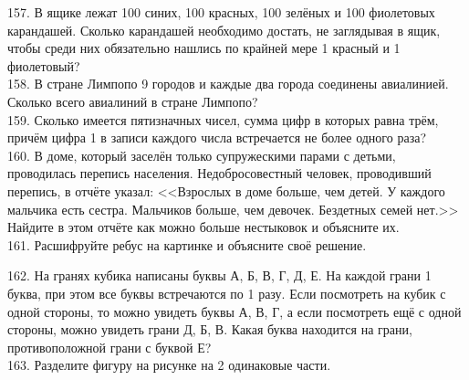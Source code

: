 \documentclass[12pt]{article}
\begin{document}
157. В ящике лежат 100 синих, 100 красных, 100 зелёных и 100 фиолетовых карандашей. Сколько карандашей необходимо достать, не заглядывая в ящик, чтобы среди них обязательно нашлись по крайней мере 1 красный и 1 фиолетовый?\\
158. В стране Лимпопо 9 городов и каждые два города соединены авиалинией. Сколько всего авиалиний в стране Лимпопо?\\
159. Сколько имеется пятизначных чисел, сумма цифр в которых равна трём, причём цифра 1 в записи каждого числа встречается не более одного раза?\\
160. В доме, который заселён только супружескими парами с детьми, проводилась перепись населения. Недобросовестный человек, проводивший перепись, в отчёте указал: <<Взрослых в доме больше, чем детей. У каждого мальчика есть сестра. Мальчиков больше, чем девочек. Бездетных семей нет.>> Найдите в этом отчёте
как можно больше нестыковок и объясните их.\\
161. Расшифруйте ребус на картинке и объясните своё решение.
\begin{center}
\begin{figure}[ht!]
\end{figure}
\end{center}
162. На гранях кубика написаны буквы А, Б, В, Г, Д, Е. На каждой грани 1 буква, при этом все буквы встречаются по 1 разу. Если посмотреть на кубик с одной стороны, то можно увидеть буквы А, В, Г, а если посмотреть ещё с одной стороны, можно увидеть грани Д, Б, В. Какая буква находится на грани, противоположной грани с буквой Е?\\
163. Разделите фигуру на рисунке на 2 одинаковые части.
\end{document}
